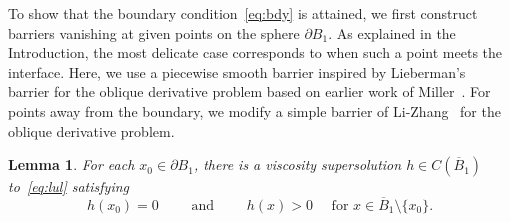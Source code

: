 \documentclass[letter,11pt]{amsart}
\newtheorem{lem}[thm]{Lemma}
\theoremstyle{definition}
\numberwithin{equation}{section}
\begin{document}
To show that the boundary condition~\eqref{eq:bdy} is attained, we first construct barriers vanishing at given points on the sphere $\partial B_1$.
As explained in the Introduction, the most delicate case corresponds to when such a point meets the interface.
Here, we use a piecewise smooth barrier inspired by Lieberman's~\cite{L} barrier for the oblique derivative problem based on earlier work of Miller~\cite{Miller}.
For points away from the boundary, we modify a simple barrier of Li-Zhang~\cite{LZ} for the oblique derivative problem.

\begin{lem}
\label{lem:barrier}
For each $x_0 \in \partial B_1$, there is a viscosity supersolution $h \in C(\overline{B}_1)$ to~\eqref{eq:lul} satisfying
\[
h(x_0) = 0
 \qquad \text{ and } 
 \qquad h(x) > 0 \quad \text{ for } x \in \overline{B}_1 \setminus \{x_0\}.
\]
\end{lem}
\end{document}
